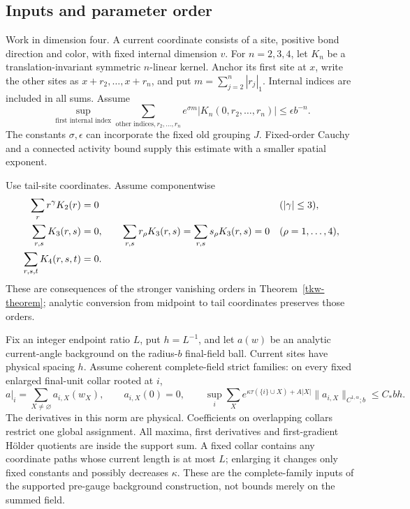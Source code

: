 \documentclass[11pt]{article}
\theoremstyle{remark}
\begin{document}
\subsection{Inputs and parameter order}
\label{lst-input-section}

Work in dimension four. A current coordinate consists of a site,
positive bond direction and color, with fixed internal dimension \(v\).
For \(n=2,3,4\), let \(K_n\) be a translation-invariant symmetric
\(n\)-linear kernel. Anchor its first site at \(x\), write the other
sites as \(x+r_2,\ldots,x+r_n\), and put
\(m=\sum_{j=2}^n|r_j|_1\). Internal indices are included in all sums.
Assume
\begin{equation}
 \sup_{\text{first internal index}}
 \sum_{\text{other indices},r_2,\ldots,r_n}
       e^{\sigma m}|K_n(0,r_2,\ldots,r_n)|
       \le \epsilon b^{-n}.
 \label{lst-kernel-bound}
\end{equation}
The constants \(\sigma,\epsilon\) can incorporate the fixed old
grouping \(J\). Fixed-order Cauchy and a connected activity bound
supply this estimate with a smaller spatial exponent.

Use tail-site coordinates. Assume componentwise
\begin{align}
 \sum_r r^\gamma K_2(r)&=0
                          &&(|\gamma|\le3),\notag\\
 \sum_{r,s}K_3(r,s)&=0,\qquad
 \sum_{r,s}r_\rho K_3(r,s)=
 \sum_{r,s}s_\rho K_3(r,s)=0
                          &&(\rho=1,\ldots,4),\notag\\
 \sum_{r,s,t}K_4(r,s,t)&=0.
 \label{lst-moments}
\end{align}
These are consequences of the stronger vanishing orders in
Theorem~\ref{tkw-theorem}; analytic conversion from midpoint
to tail coordinates preserves those orders.

Fix an integer endpoint ratio \(L\), put \(h=L^{-1}\), and let
\(a(w)\) be an analytic current-angle background on the radius-\(b\)
final-field ball. Current sites have physical spacing \(h\).
Assume coherent complete-field strict families: on every fixed
enlarged final-unit collar rooted at \(i\),
\begin{equation}
 a|_i=\sum_{X\ne\varnothing}a_{i,X}(w_X),\qquad
 a_{i,X}(0)=0,\qquad
 \sup_i\sum_X e^{\kappa\tau(\{i\}\cup X)+A|X|}
           \|a_{i,X}\|_{C^{1,\alpha};b}
       \le C_* b h .
 \label{lst-background}
\end{equation}
The derivatives in this norm are physical. Coefficients on
overlapping collars restrict one global assignment. All maxima,
first derivatives and first-gradient H\"older quotients are
inside the support sum. A fixed collar contains any coordinate
paths whose current length is at most \(L\); enlarging it changes
only fixed constants and possibly decreases \(\kappa\).
These are the complete-family inputs of the supported pre-gauge
background construction, not bounds merely on the summed field.
\end{document}
